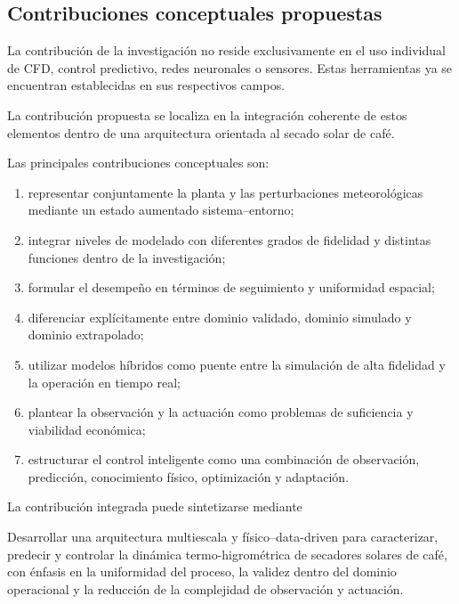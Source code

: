 \subsection{Contribuciones conceptuales propuestas}
\label{subsec:contribuciones_conceptuales}

La contribución de la investigación no reside exclusivamente en el uso individual de CFD, control predictivo, redes neuronales o sensores. Estas herramientas ya se encuentran establecidas en sus respectivos campos.

La contribución propuesta se localiza en la integración coherente de estos elementos dentro de una arquitectura orientada al secado solar de café.

Las principales contribuciones conceptuales son:

\begin{enumerate}
    \item representar conjuntamente la planta y las perturbaciones meteorológicas mediante un estado aumentado sistema--entorno;
    
    \item integrar niveles de modelado con diferentes grados de fidelidad y distintas funciones dentro de la investigación;
    
    \item formular el desempeño en términos de seguimiento y uniformidad espacial;
    
    \item diferenciar explícitamente entre dominio validado, dominio simulado y dominio extrapolado;
    
    \item utilizar modelos híbridos como puente entre la simulación de alta fidelidad y la operación en tiempo real;
    
    \item plantear la observación y la actuación como problemas de suficiencia y viabilidad económica;
    
    \item estructurar el control inteligente como una combinación de observación, predicción, conocimiento físico, optimización y adaptación.
\end{enumerate}

La contribución integrada puede sintetizarse mediante

\begin{tcolorbox}[
title=Contribución conceptual integrada,
colback=green!3,
colframe=green!50!black,
boxrule=0.8pt,
arc=2mm
]
Desarrollar una arquitectura multiescala y físico--data-driven para caracterizar, predecir y controlar la dinámica termo-higrométrica de secadores solares de café, con énfasis en la uniformidad del proceso, la validez dentro del dominio operacional y la reducción de la complejidad de observación y actuación.
\end{tcolorbox}


